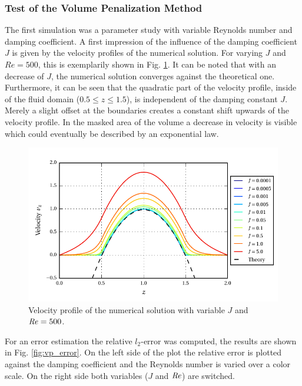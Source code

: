 \subsubsection{Test of the Volume Penalization Method}

The first simulation was  a parameter study with variable Reynolds number and damping coefficient.
A first impression of the influence of the damping coefficient $J$ is given by the velocity profiles of the numerical solution.
For varying $J$ and $Re=500$, this is exemplarily shown in Fig. \ref{fig:vp_flow}.
 It can be noted that with an decrease of $J$, the numerical solution converges against the theoretical one.
Furthermore, it can be seen that the quadratic part of the velocity profile,
inside of the fluid domain ($0.5\leq z \leq 1.5$), is independent of the damping constant $J$.
Merely a slight offset at the boundaries creates a constant shift upwards of the velocity profile.
In the masked area of the volume a decrease in velocity is visible which could  eventually be described by an
exponential law.

\begin{figure}[!t]
  \centering
  \includegraphics{gfx/immersed_boundary/poiseuille_flow/2_vp/vp_profile.pdf}  \caption{\label{fig:vp_flow}
    Velocity profile of the numerical solution with variable $J$ and $\mbox{\textit{Re}} = 500$.}
\end{figure}

For an error estimation the relative $l_2$-error was computed, the results are shown in Fig. \ref{fig:vp_error}.
On the left side of the plot the relative error is plotted against the damping coefficient and the Reynolds number is
varied over a color scale. On the right side both variables ($J$ and $\mbox{\textit{Re}}$) are switched.

